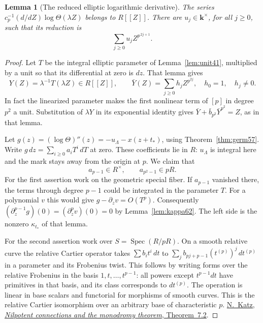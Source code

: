 \documentclass[a4paper,11pt]{article}
\newtheorem{lemma}[proposition]{Lemma}
\theoremstyle{definition}
\theoremstyle{remark}
\numberwithin{equation}{section}
\begin{document}
\begin{lemma}[The reduced elliptic logarithmic derivative]
\leavevmode\label{lem:cartiergradient860}
The series \(c_p^{-1}(d/dZ)\log\Theta(\lambda Z)\) belongs
to \(R[[Z]]\). There are \(u_j\in\mathbf k^\times\), for all
\(j\ge0\), such that its reduction is
\[
                      \sum_{j\ge0}u_j Z^{p^{\,2j+1}} .
\]
\end{lemma}
\begin{proof}
Let \(T\) be the integral elliptic parameter of
Lemma~\ref{lem:unit41}, multiplied by a unit so that its
differential at zero is \(dz\). That lemma gives
\[
 Y(Z)=\lambda^{-1}T(\lambda Z)\in R[[Z]],\qquad
             \bar Y(Z)=\sum_{j\ge0}h_j Z^{p^{2j}},\quad
                    h_0=1,\quad h_j\ne0.
\]
In fact the linearized parameter makes the first nonlinear
term of \([p]\) in degree \(p^2\) a unit. Substitution of
\(\lambda Y\) in its exponential identity gives
\(\bar Y+\bar b_{p^2}\bar Y^{p^2}=Z\), as in that lemma.

Let \(g(z)=(\log\Theta)''(z)=-u_\Lambda-x(z+t_*)\), using
Theorem~\ref{thm:germ57}. Write
\(g\,dz=\sum_{i\ge0}a_iT^i\,dT\) at zero. These coefficients
lie in \(R\): \(u_\Lambda\) is integral here and the mark
stays away from the origin at \(p\). We claim that
\[
                a_{p-1}\in R^\times,\qquad
                a_{p^2-1}\in pR .
\]
For the first assertion work on the geometric special fiber.
If \(a_{p-1}\) vanished there, the terms through degree
\(p-1\) could be integrated in the parameter \(T\). For a
polynomial \(v\) this would give \(g-\partial_z v=O(T^p)\).
Consequently \((\partial_z^{p-1}g)(0)=(\partial_z^p v)(0)=0\)
by Lemma~\ref{lem:kappa62}. The left side is the nonzero
\(\kappa_{t_*}\) of that lemma.

For the second assertion work over \(S=\operatorname{Spec}(R/pR)\).
On a smooth relative curve the relative Cartier operator takes
\(\sum b_i t^i\,dt\) to
\(\sum_j b_{pj+p-1}(t^{(p)})^j\,dt^{(p)}\) in a parameter and
its Frobenius twist. This follows by writing forms over the
relative Frobenius in the basis \(1,t,\ldots,t^{p-1}\):
all powers except \(t^{p-1}dt\) have primitives in that basis,
and its class corresponds to \(dt^{(p)}\). The operation is
linear in base scalars and functorial for morphisms of smooth
curves. This is the relative Cartier isomorphism over an
arbitrary base of characteristic \(p\).
\href{https://numdam.org/articles/10.1007/BF02684688/}{N.~Katz,
\emph{Nilpotent connections and the monodromy theorem}, Theorem~7.2}.


\end{proof}
\end{document}
